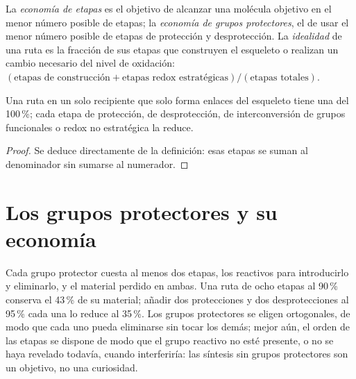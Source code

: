 \begin{definition}\label{def:b3:total-synthesis:economy}
La \emph{economía de etapas} es el objetivo de alcanzar una molécula objetivo en el menor
número posible de etapas; la \emph{economía de grupos protectores},
el de usar el menor número posible de etapas de protección y desprotección. La
\emph{idealidad} de una ruta es la fracción de sus etapas que
construyen el esqueleto o realizan un cambio necesario del nivel de oxidación:
$(\text{etapas de construcción} + \text{etapas redox estratégicas})/(\text{etapas totales})$.
\end{definition}

\begin{proposition}\label{prop:b3:total-synthesis:ideality}
Una ruta en un solo recipiente que solo forma enlaces del esqueleto tiene una  del 100\,\%; cada etapa de protección,
de desprotección, de interconversión de grupos funcionales o redox no estratégica
la reduce.
\end{proposition}

\begin{proof}
Se deduce directamente de la definición: esas etapas se suman al denominador sin sumarse
al numerador.
\end{proof}

\section{Los grupos protectores y su economía}

Cada grupo protector cuesta al menos dos etapas, los reactivos para introducirlo y
eliminarlo, y el material perdido en ambas. Una ruta de ocho etapas al 90\,\% conserva
el 43\,\% de su material; añadir dos protecciones y dos desprotecciones al 95\,\% cada una
lo reduce al 35\,\%. Los grupos protectores se eligen ortogonales, de modo que cada uno pueda
eliminarse sin tocar los demás; mejor aún, el orden de las etapas se
dispone de modo que el grupo reactivo no esté presente, o no se haya revelado todavía, cuando
interferiría: las síntesis sin grupos protectores son un objetivo, no una curiosidad.

